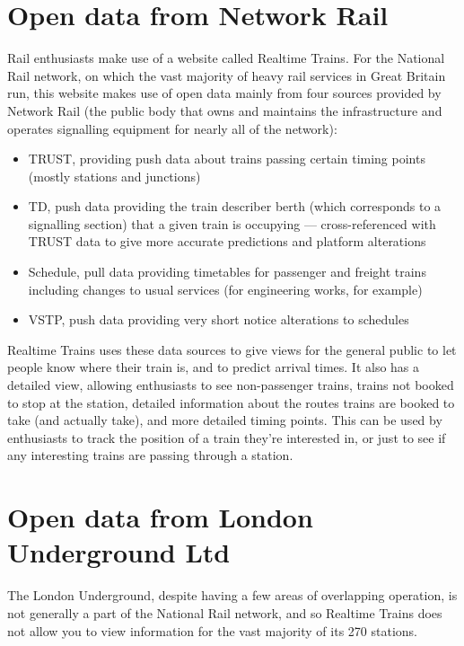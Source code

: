 \documentclass[a4paper,12pt,twoside]{report}
\begin{document}
\section{Open data from Network Rail}

Rail enthusiasts make use of a website called Realtime Trains. For the National
Rail network, on which the vast majority of heavy rail services in Great
Britain run, this website makes use of open data mainly from four sources
provided by Network Rail (the public body that owns and maintains the
infrastructure and operates signalling equipment for nearly all of the
network)\cite{RTTData}:

\begin{itemize}
  \item TRUST, providing push data about trains passing certain timing points
    (mostly stations and junctions)
  \item TD, push data providing the train describer berth (which corresponds to
    a signalling section) that a given train is occupying --- cross-referenced
    with TRUST data to give more accurate predictions and platform alterations
  \item Schedule, pull data providing timetables for passenger and freight
    trains including changes to usual services (for engineering works, for
    example)
  \item VSTP, push data providing very short notice alterations to schedules
\end{itemize}

Realtime Trains uses these data sources to give views for the general public to
let people know where their train is, and to predict arrival times. It also has
a detailed view, allowing enthusiasts to see non-passenger trains, trains not
booked to stop at the station, detailed information about the routes trains are
booked to take (and actually take), and more detailed timing points. This can
be used by enthusiasts to track the position of a train they're interested in,
or just to see if any interesting trains are passing through a station.

\section{Open data from London Underground Ltd}

The London Underground, despite having a few areas of overlapping operation, is
not generally a part of the National Rail network, and so Realtime Trains does
not allow you to view information for the vast majority of its 270 stations.
\end{document}
